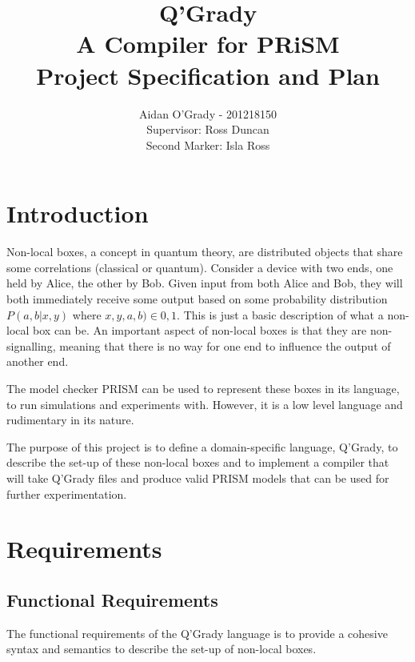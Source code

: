 \documentclass[11pt, a4paper]{article}
\begin{document}
\title{Q'Grady \\A Compiler for PRiSM \\
\large{Project Specification and Plan}}
\author{Aidan O'Grady - 201218150\\Supervisor: Ross Duncan\\Second Marker: Isla
Ross}
\date{}
\maketitle

\section{Introduction} %
\label{sec:introduction}
Non-local boxes, a concept in quantum theory, are distributed objects that share
some correlations (classical or quantum). Consider a device with two ends, one
held by Alice, the other by Bob. Given input from both Alice and Bob, they will
both immediately receive some output based on some probability distribution
\(P(a,b|x,y)\) where \(x,y,a,b) \in {0,1}\). This is just a basic description of
what a non-local box can be. An important aspect of non-local boxes is that they
are non-signalling, meaning that there is no way for one end to influence the
output of another end.

The model checker PRISM can be used to represent these boxes in its language,
to run simulations and experiments with. However, it is a low level language and
rudimentary in its nature.

The purpose of this project is to define a domain-specific language, Q'Grady, to
describe the set-up of these non-local boxes and to implement a compiler that
will take Q'Grady files and produce valid PRISM models that can be used for
further experimentation.


\section{Requirements} %
\label{sec:requirements}
\subsection{Functional Requirements} %
\label{sub:functional_requirements}
The functional requirements of the Q'Grady language is to provide a cohesive
syntax and semantics to describe the set-up of non-local boxes.
\end{document}
